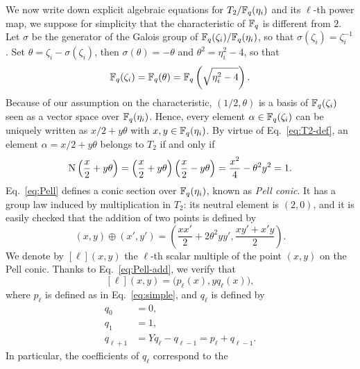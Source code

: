 \documentclass{sig-alternate}
\begin{document}
We now write down explicit algebraic equations for $T_2/\mathbb{F}_q(\eta_i)$
and its $\ell$-th power map, we suppose for simplicity that the
characteristic of $\mathbb{F}_q$ is different from $2$. Let $\sigma$ be the
generator of the Galois group of $\mathbb{F}_q(\zeta_i)/\mathbb{F}_q(\eta_i)$, so that
$\sigma(\zeta_i)=\zeta_i^{-1}$. Set $\theta = \zeta_i -
\sigma(\zeta_i)$, then $\sigma(\theta)=-\theta$ and $\theta^2 =
\eta_i^2-4$, so that
\begin{equation}
  \mathbb{F}_q(\zeta_i) = \mathbb{F}_q(\theta) = \mathbb{F}_q\left(\sqrt{\eta_i^2-4}\right).
\end{equation}
Because of our assumption on the characteristic, $(1/2, \theta)$ is a
basis of $\mathbb{F}_q(\zeta_i)$ seen as a vector space over
$\mathbb{F}_q(\eta_i)$. Hence, every element $\alpha\in\mathbb{F}_q(\zeta_i)$ can be
uniquely written as $x/2 + y\theta$ with $x,y\in\mathbb{F}_q(\eta_i)$. By
virtue of Eq.~\eqref{eq:T2-def}, an element $\alpha=x/2+y\theta$
belongs to $T_2$ if and only if
\begin{equation}
  \label{eq:Pell}
  \operatorname{N}\left(\frac{x}{2} + y\theta\right) = 
  \left(\frac{x}{2} + y\theta\right)\left(\frac{x}{2} - y\theta\right) =
  \frac{x^2}{4} - \theta^2y^2 = 1.
\end{equation}
Eq.~\eqref{eq:Pell} defines a conic section over $\mathbb{F}_q(\eta_i)$, known
as \emph{Pell conic}. It has a group law induced by multiplication in
$T_2$: its neutral element is $(2,0)$, and it is easily checked that
the addition of two points is defined by
\begin{equation}
  \label{eq:Pell-add}
  (x,y)\oplus(x',y') =
  \left(\frac{xx'}{2} + 2\theta^2yy', \frac{xy' + x'y}{2}\right).
\end{equation}
We denote by $[\ell](x,y)$ the $\ell$-th scalar multiple of the point
$(x,y)$ on the Pell conic. Thanks to Eq.~\eqref{eq:Pell-add}, we
verify that
\begin{equation}
  \label{eq:Pell-rec}
  [\ell](x,y) = \bigr(p_\ell(x), yq_\ell(x)\bigl),
\end{equation}
where $p_\ell$ is defined as in Eq.~\eqref{eq:simple}, and $q_\ell$ is
defined by
\begin{equation}
  \label{eq:fibonacci}
  \begin{aligned}
    q_0 &= 0,\\
    q_1 &= 1,\\
    q_{\ell+1} &= Yq_{\ell} - q_{\ell-1} = p_\ell + q_{\ell-1}.
  \end{aligned}
\end{equation}
In particular, the coefficients of $q_\ell$ correspond to the
\end{document}
